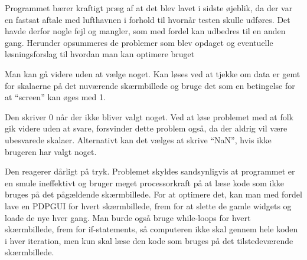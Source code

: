 Programmet bærer kraftigt præg af at det blev lavet i sidste øjeblik, da der var en fastsat aftale med lufthavnen i forhold til hvornår testen skulle udføres. Det havde derfor nogle fejl og mangler, som med fordel kan udbedres til en anden gang. Herunder opsummeres de problemer som blev opdaget og eventuelle løsningsforslag til hvordan man kan optimere bruget 

Man kan gå videre uden at vælge noget. Kan løses ved at tjekke om data er gemt for skalaerne på det nuværende skærmbillede og bruge det som en betingelse for at ``screen'' kan øges med 1.

Den skriver 0 når der ikke bliver valgt noget. Ved at løse problemet med at folk gik videre uden at svare, forsvinder dette problem også, da der aldrig vil være ubesvarede skalaer. Alternativt kan det vælges at skrive ``NaN'', hvis ikke brugeren har valgt noget.

Den reagerer dårligt på tryk. Problemet skyldes sandsynligvis at programmet er en smule ineffektivt og bruger meget processorkraft på at læse kode som ikke bruges på det pågældende skærmbillede. For at optimere det, kan man med fordel lave en PDPGUI for hvert skærmbillede, frem for at slette de gamle widgets og loade de nye hver gang. Man burde også bruge while-loops for hvert skærmbillede, frem for if-statements, så computeren ikke skal gennem hele koden i hver iteration, men kun skal læse den kode som bruges på det tilstedeværende skærmbillede.
